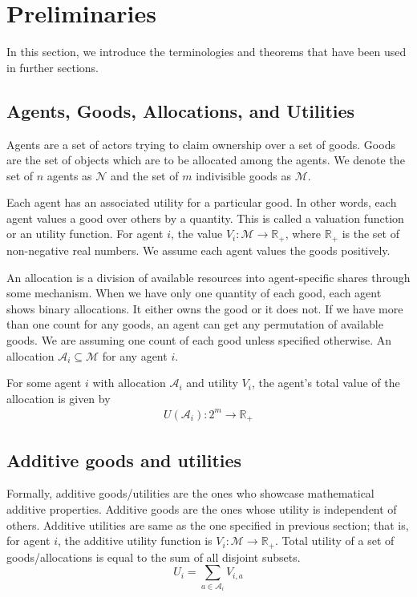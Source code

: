 \section{Preliminaries}
\label{section_prelim}
In this section, we introduce the terminologies and theorems that have been used in further sections.

\subsection{Agents, Goods, Allocations, and Utilities}
Agents are a set of actors trying to claim ownership over a set of goods. Goods are the set of objects which are to be allocated among the agents. We denote the set of $n$ agents as $\mathcal{N}$ and the set of $m$ indivisible goods as $\mathcal{M}$.

Each agent has an associated utility for a particular good. In other words, each agent values a good over others by a quantity. This is called a valuation function or an utility function. For agent $i$, the value $V_i: \mathcal{M}\rightarrow \mathbb{R_+}$, where $\mathbb{R_+}$ is the set of non-negative real numbers. We assume each agent values the goods positively.

An allocation is a division of available resources into agent-specific shares through some mechanism. When we have only one quantity of each good, each agent shows binary allocations. It either owns the good or it does not. If we have more than one count for any goods, an agent can get any permutation of available goods. We are assuming one count of each good unless specified otherwise. An allocation $\mathcal{A}_i\subseteq \mathcal{M}$ for any agent $i$.

For some agent $i$ with allocation $\mathcal{A}_i$ and utility $V_i$, the agent's total value of the allocation is given by
\begin{gather}
    U(\mathcal{A}_i): 2^m \rightarrow \mathbb{R_+}
\end{gather}


\subsection{Additive goods and utilities}
Formally, additive goods/utilities are the ones who showcase mathematical additive properties. Additive goods are the ones whose utility is independent of others. Additive utilities are same as the one specified in previous section; that is, for agent $i$, the additive utility function is $V_i: \mathcal{M} \rightarrow \mathbb{R_+}$. Total utility of a set of goods/allocations is equal to the sum of all disjoint subsets.
\[
    U_i = \sum_{a \in \mathcal{A}_i} V_{i,a}
\]

